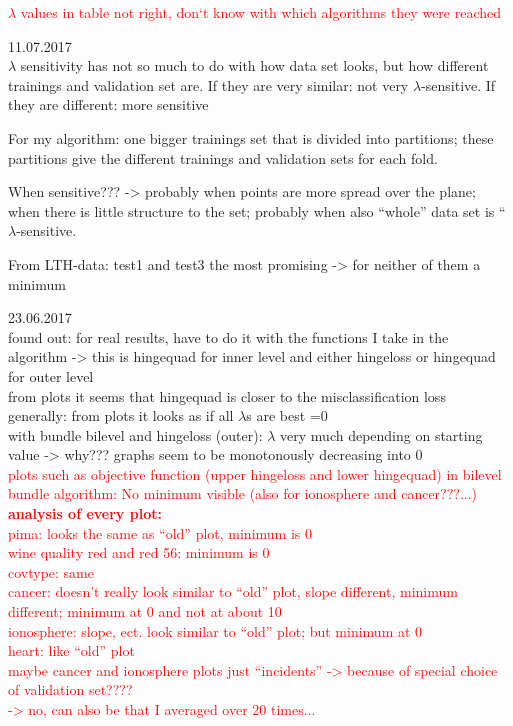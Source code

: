 \textcolor{red}{\(\lambda\) values in table not right, don`t know with which algorithms they were reached}

11.07.2017 \\
\(\lambda\) sensitivity has not so much to do with how data set looks, but how different trainings and validation set are.
If they are very similar: not very \(\lambda\)-sensitive. If they are different: more sensitive

For my algorithm: one  bigger trainings set that is divided into partitions; these partitions give the different trainings and validation sets for each fold.

When sensitive??? -> probably when points are more spread over the plane; when there is little structure to the set; probably when also ``whole'' data set is ``\(\lambda\)-sensitive.

From LTH-data: test1 and test3 the most promising -> for neither of them a minimum



23.06.2017\\
found out: for real results, have to do it with the functions I take in the algorithm -> this is hingequad for inner level and either hingeloss or hingequad for outer level\\
from plots it seems that hingequad is closer to the misclassification loss\\
generally: from plots it looks as if all \(\lambda\)s are best =0\\
with bundle bilevel and hingeloss (outer): \(\lambda\) very much depending on starting value -> why??? graphs seem to be monotonously decreasing into 0  \\


\textcolor{red}{plots such as objective function (upper hingeloss and lower hingequad) in bilevel bundle algorithm: No minimum visible (also for ionosphere and cancer???...)\\
\textbf{analysis of every plot:}\\
pima: looks the same as ``old'' plot, minimum is 0\\
wine quality red and red 56: minimum is 0 \\
covtype: same\\
cancer: doesn't really look similar to ``old'' plot, slope different, minimum different; minimum at 0 and not at about 10\\
ionosphere: slope, ect. look similar to ``old'' plot; but minimum at 0 \\
heart: like ``old'' plot \\
maybe cancer and ionosphere plots just ``incidents'' -> because of special choice of validation set????\\
-> no, can also be that I averaged over 20 times...}

